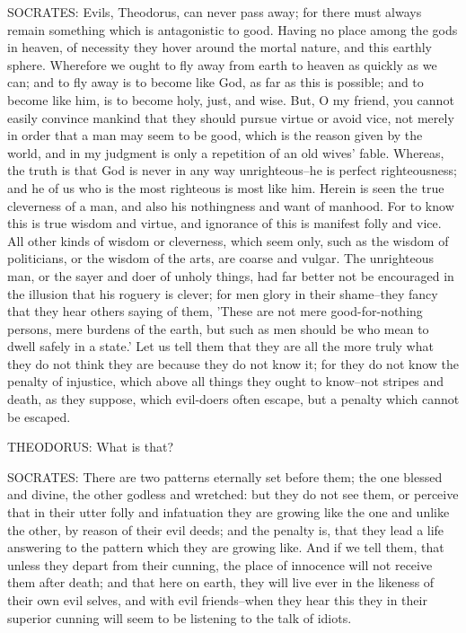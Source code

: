 SOCRATES: Evils, Theodorus, can never pass away; for there must always
remain something which is antagonistic to good. Having no place among
the gods in heaven, of necessity they hover around the mortal nature,
and this earthly sphere. Wherefore we ought to fly away from earth to
heaven as quickly as we can; and to fly away is to become like God,
as far as this is possible; and to become like him, is to become holy,
just, and wise. But, O my friend, you cannot easily convince mankind
that they should pursue virtue or avoid vice, not merely in order that a
man may seem to be good, which is the reason given by the world, and in
my judgment is only a repetition of an old wives' fable. Whereas,
the truth is that God is never in any way unrighteous--he is perfect
righteousness; and he of us who is the most righteous is most like him.
Herein is seen the true cleverness of a man, and also his nothingness
and want of manhood. For to know this is true wisdom and virtue, and
ignorance of this is manifest folly and vice. All other kinds of wisdom
or cleverness, which seem only, such as the wisdom of politicians, or
the wisdom of the arts, are coarse and vulgar. The unrighteous man, or
the sayer and doer of unholy things, had far better not be encouraged
in the illusion that his roguery is clever; for men glory in their
shame--they fancy that they hear others saying of them, 'These are not
mere good-for-nothing persons, mere burdens of the earth, but such as
men should be who mean to dwell safely in a state.' Let us tell them
that they are all the more truly what they do not think they are because
they do not know it; for they do not know the penalty of injustice,
which above all things they ought to know--not stripes and death, as
they suppose, which evil-doers often escape, but a penalty which cannot
be escaped.

THEODORUS: What is that?

SOCRATES: There are two patterns eternally set before them; the one
blessed and divine, the other godless and wretched: but they do not see
them, or perceive that in their utter folly and infatuation they are
growing like the one and unlike the other, by reason of their evil
deeds; and the penalty is, that they lead a life answering to the
pattern which they are growing like. And if we tell them, that unless
they depart from their cunning, the place of innocence will not receive
them after death; and that here on earth, they will live ever in the
likeness of their own evil selves, and with evil friends--when they hear
this they in their superior cunning will seem to be listening to the
talk of idiots.

